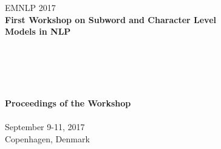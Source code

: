 \documentclass[11pt]{article}
\begin{document}
  \begin{center}
  \LARGE EMNLP 2017 \\
  \vspace*{55mm}
    {\bf
    \LARGE
     First Workshop on Subword and Character Level\\
    Models in NLP \\

    \hspace*{1cm}\\ \hspace*{1cm} \\
    \hspace*{1cm} \\ \hspace*{1cm}\\
    \hspace*{1cm}\\
    \vspace{2cm}
    \LARGE
    Proceedings of the Workshop\\
    \vspace{2cm}
    \hspace*{1cm}} \\ %
    \vspace{43mm}
    \LARGE
    September 9-11, 2017\\
    Copenhagen, Denmark
  \end{center}
\end{document}
